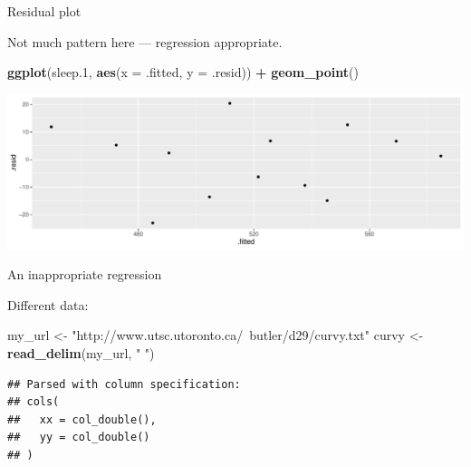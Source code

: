 \documentclass[
  ignorenonframetext,
]{beamer}
\newenvironment{Shaded}{\begin{snugshade}}{\end{snugshade}}
\newcommand{\DataTypeTok}[1]{\textcolor[rgb]{0.13,0.29,0.53}{#1}}
\newcommand{\FloatTok}[1]{\textcolor[rgb]{0.00,0.00,0.81}{#1}}
\newcommand{\KeywordTok}[1]{\textcolor[rgb]{0.13,0.29,0.53}{\textbf{#1}}}
\newcommand{\NormalTok}[1]{#1}
\newcommand{\OperatorTok}[1]{\textcolor[rgb]{0.81,0.36,0.00}{\textbf{#1}}}
\newcommand{\StringTok}[1]{\textcolor[rgb]{0.31,0.60,0.02}{#1}}
\begin{document}
\begin{frame}[fragile]{Residual plot}
\protect\hypertarget{residual-plot}{}

Not much pattern here --- regression appropriate.

\begin{Shaded}
\begin{Highlighting}[]
\KeywordTok{ggplot}\NormalTok{(sleep}\FloatTok{.1}\NormalTok{, }\KeywordTok{aes}\NormalTok{(}\DataTypeTok{x =}\NormalTok{ .fitted, }\DataTypeTok{y =}\NormalTok{ .resid)) }\OperatorTok{+}\StringTok{ }\KeywordTok{geom_point}\NormalTok{()}
\end{Highlighting}
\end{Shaded}

\includegraphics{slides_d29_files/figure-beamer/akjhkadjfhjahnkkk-1.pdf}

\end{frame}

\begin{frame}[fragile]{An inappropriate regression}
\protect\hypertarget{an-inappropriate-regression}{}

Different data:

\begin{Shaded}
\begin{Highlighting}[]
\NormalTok{my_url <-}\StringTok{ "http://www.utsc.utoronto.ca/~butler/d29/curvy.txt"}
\NormalTok{curvy <-}\StringTok{ }\KeywordTok{read_delim}\NormalTok{(my_url, }\StringTok{" "}\NormalTok{)}
\end{Highlighting}
\end{Shaded}

\begin{verbatim}
## Parsed with column specification:
## cols(
##   xx = col_double(),
##   yy = col_double()
## )
\end{verbatim}

\end{frame}
\end{document}
